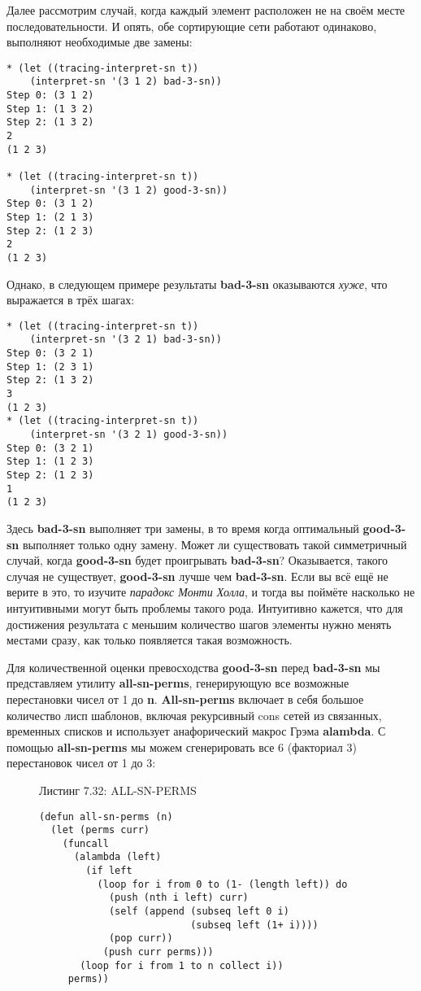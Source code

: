 Далее рассмотрим случай, когда каждый элемент расположен не на своём месте последовательности. И опять, обе сортирующие сети работают одинаково, выполняют необходимые две замены:

\begin{verbatim}
* (let ((tracing-interpret-sn t))
    (interpret-sn '(3 1 2) bad-3-sn))
Step 0: (3 1 2)
Step 1: (1 3 2)
Step 2: (1 3 2)
2
(1 2 3)

* (let ((tracing-interpret-sn t))
    (interpret-sn '(3 1 2) good-3-sn))
Step 0: (3 1 2)
Step 1: (2 1 3)
Step 2: (1 2 3)
2
(1 2 3)
\end{verbatim}

Однако, в следующем примере результаты \textbf{bad-3-sn} оказываются \emph{хуже}, что выражается в трёх шагах:

\begin{verbatim}
* (let ((tracing-interpret-sn t))
    (interpret-sn '(3 2 1) bad-3-sn))
Step 0: (3 2 1)
Step 1: (2 3 1)
Step 2: (1 3 2)
3
(1 2 3)
* (let ((tracing-interpret-sn t))
    (interpret-sn '(3 2 1) good-3-sn))
Step 0: (3 2 1)
Step 1: (1 2 3)
Step 2: (1 2 3)
1
(1 2 3)
\end{verbatim}

Здесь \textbf{bad-3-sn} выполняет три замены, в то время когда оптимальный \textbf{good-3-sn} выполняет только одну замену. Может ли существовать такой симметричный случай, когда \textbf{good-3-sn} будет проигрывать \textbf{bad-3-sn}? Оказывается, такого случая не существует, \textbf{good-3-sn} лучше чем \textbf{bad-3-sn}. Если вы всё ещё не верите в это, то изучите \emph{парадокс Монти Холла}, и тогда вы поймёте насколько не интуитивными могут быть проблемы такого рода. Интуитивно кажется, что для достижения результата с меньшим количество шагов элементы нужно менять местами сразу, как только появляется такая возможность.

Для количественной оценки превосходства \textbf{good-3-sn} перед \textbf{bad-3-sn} мы представляем утилиту \textbf{all-sn-perms}, генерирующую все возможные перестановки чисел от 1 до \textbf{n}. \textbf{All-sn-perms} включает в себя большое количество лисп шаблонов, включая рекурсивный cons сетей из связанных, временных списков и использует анафорический макрос Грэма \textbf{alambda}. С помощью \textbf{all-sn-perms} мы можем сгенерировать все 6 (факториал 3) перестановок чисел от 1 до 3:

\begin{figure}Листинг 7.32: ALL-SN-PERMS\label{listing_7.32}
\listbegin
\begin{verbatim}
(defun all-sn-perms (n)
  (let (perms curr)
    (funcall
      (alambda (left)
        (if left
          (loop for i from 0 to (1- (length left)) do
            (push (nth i left) curr)
            (self (append (subseq left 0 i)
                          (subseq left (1+ i))))
            (pop curr))
           (push curr perms)))
       (loop for i from 1 to n collect i))
     perms))
\end{verbatim}
\listend
\end{figure}

